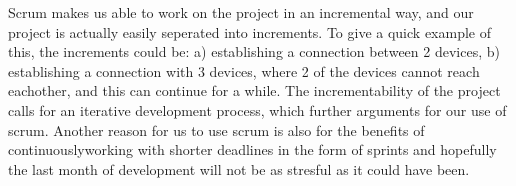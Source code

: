 Scrum makes us able to work on the project in an incremental way, and our project is actually easily seperated into increments.
To give a quick example of this, the increments could be: a) establishing a connection between 2 devices, b) establishing a connection with 3 devices, where 2 of the devices cannot reach eachother, and this can continue for a while.
The incrementability of the project calls for an iterative development process, which further arguments for our use of scrum.
Another reason for us to use scrum is also for the benefits of continuouslyworking with shorter deadlines in the form of sprints and hopefully the last month of development will not be as stresful as it could have been.